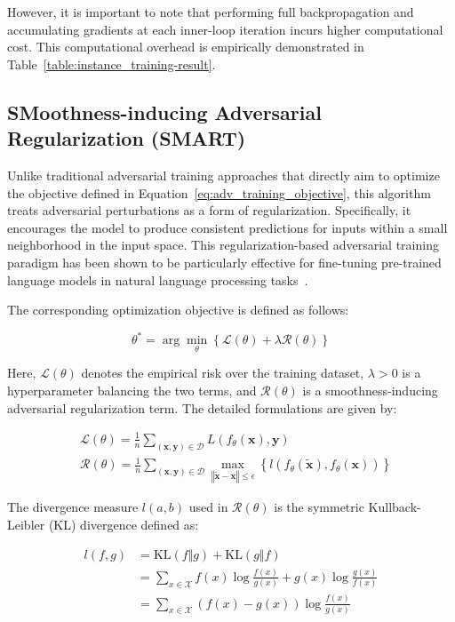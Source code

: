 \documentclass[10pt,twocolumn,letterpaper]{article}
\begin{document}
However, it is important to note that performing full backpropagation and accumulating gradients at each inner-loop iteration incurs higher computational cost. This computational overhead is empirically demonstrated in Table~\ref{table:instance_training-result}.

\subsection{SMoothness-inducing Adversarial Regularization (SMART)}

Unlike traditional adversarial training approaches that directly aim to optimize the objective defined in Equation~\ref{eq:adv_training_objective}, this algorithm treats adversarial perturbations as a form of regularization. Specifically, it encourages the model to produce consistent predictions for inputs within a small neighborhood in the input space. This regularization-based adversarial training paradigm has been shown to be particularly effective for fine-tuning pre-trained language models in natural language processing tasks~\cite{Jiang_2020}.

The corresponding optimization objective is defined as follows:

\begin{equation}
\theta^* = \arg\min_\theta\left\{\mathcal{L}(\theta) + \lambda \mathcal{R}(\theta)\right\}
\tag{2:4:1}
\label{formula:adversarial_target2}
\end{equation}

Here, $\mathcal{L}(\theta)$ denotes the empirical risk over the training dataset, $\lambda > 0$ is a hyperparameter balancing the two terms, and $\mathcal{R}(\theta)$ is a smoothness-inducing adversarial regularization term. The detailed formulations are given by:

$$
\begin{aligned}
  &\mathcal{L}(\theta)=\frac{1}{n}\sum_{(\mathbf{x}, \mathbf{y})\in\mathcal{D}} L(f_\theta(\mathbf{x}), \mathbf{y}) \\
  &\mathcal{R}(\theta)=\frac{1}{n}\sum_{(\mathbf{x}, \mathbf{y})\in\mathcal{D}} \max_{\left\Vert \tilde{\mathbf{x}}-\mathbf{x}\right\Vert\leq \epsilon}\left\{l\left(f_\theta(\tilde{\mathbf{x}}), f_\theta(\mathbf{x})\right)\right\}
\end{aligned}
$$

The divergence measure $l(a, b)$ used in $\mathcal{R}(\theta)$ is the symmetric Kullback-Leibler (KL) divergence defined as:

$$
\begin{aligned}
l(f, g)&=\mathrm{KL}(f\Vert g) + \mathrm{KL}(g\Vert f) \\
&=\sum_{x\in \mathcal{X}} f(x)\log\frac{f(x)}{g(x)} + g(x)\log\frac{g(x)}{f(x)} \\
&=\sum_{x\in \mathcal{X}} (f(x) - g(x))\log\frac{f(x)}{g(x)}
\end{aligned}
$$
\end{document}

